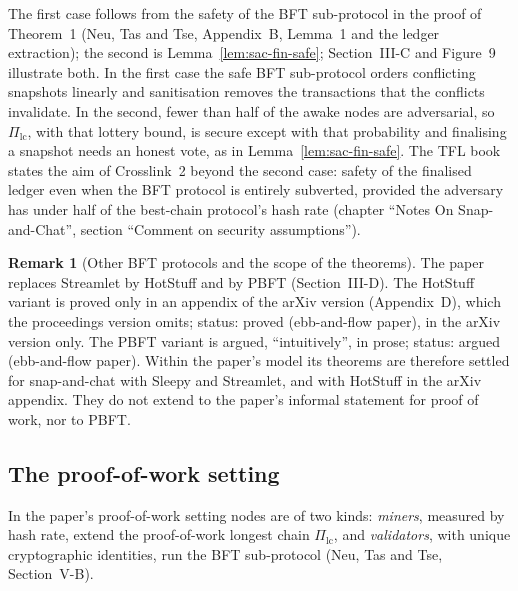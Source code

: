 \documentclass[11pt,a4paper]{article}
\theoremstyle{definition}
\newtheorem{remark}[theorem]{Remark}
\newcommand{\Pilc}{\Pi_{\mathrm{lc}}}
\begin{document}
The first case follows from the safety of the BFT sub-protocol in the proof
of Theorem~1 (Neu, Tas and Tse, Appendix~B, Lemma~1 and the ledger
extraction); the second is Lemma~\ref{lem:sac-fin-safe}; Section~III-C and
Figure~9 illustrate both. In the first case the safe BFT sub-protocol orders
conflicting snapshots linearly and sanitisation removes the transactions
that the conflicts invalidate. In the second, fewer than half of the awake
nodes are adversarial, so $\Pilc$, with that lottery bound, is secure except
with that probability and
finalising a snapshot needs an honest vote, as in Lemma~\ref{lem:sac-fin-safe}.
The TFL book states the aim of Crosslink~2 beyond the second case: safety of the
finalised ledger even when the BFT protocol is entirely subverted, provided the
adversary has under half of the best-chain protocol's hash rate (chapter ``Notes
On Snap-and-Chat'', section ``Comment on security assumptions'').

\begin{remark}[Other BFT protocols and the scope of the theorems]
\label{rem:ntt-scope}
The paper replaces Streamlet by HotStuff and by PBFT (Section~III-D). The
HotStuff variant is proved only in an appendix of the arXiv version
(Appendix~D), which the proceedings version omits; status: proved
(ebb-and-flow paper), in the arXiv version only. The PBFT variant is argued,
``intuitively'', in prose; status: argued (ebb-and-flow paper). Within the
paper's model its theorems are therefore settled for snap-and-chat with
Sleepy and Streamlet, and with HotStuff in the arXiv appendix. They do not
extend to the paper's informal statement for proof of work, nor to PBFT.
\end{remark}

\subsection{The proof-of-work setting}\label{sec:model-pow}

In the paper's proof-of-work setting nodes are of two kinds:
\emph{miners}, measured by hash rate, extend the proof-of-work longest chain
$\Pilc$, and \emph{validators}, with unique cryptographic identities, run the
BFT sub-protocol (Neu, Tas and Tse, Section~V-B).
\end{document}
